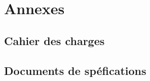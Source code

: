 \appendix
\chapter{Annexes}
\section{Cahier des charges}\label{sec:cac}

\section{Documents de spéfications}\label{sec:spe}


